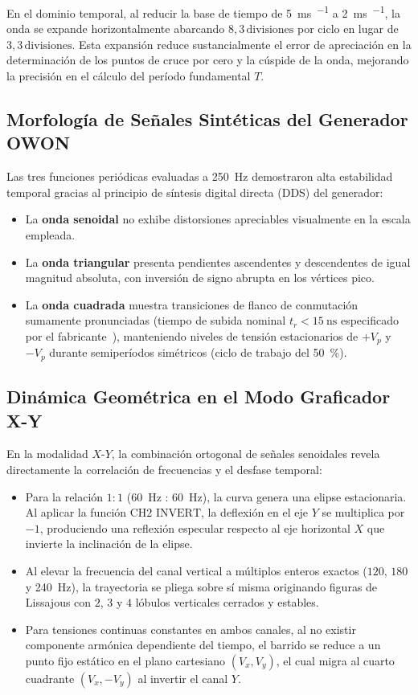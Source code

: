 En el dominio temporal, al reducir la base de tiempo de \qty{5}{\milli\second\per\division} a \qty{2}{\milli\second\per\division}, la onda se expande horizontalmente abarcando $8{,}3\,\text{divisiones}$ por ciclo en lugar de $3{,}3\,\text{divisiones}$. Esta expansión reduce sustancialmente el error de apreciación en la determinación de los puntos de cruce por cero y la cúspide de la onda, mejorando la precisión en el cálculo del período fundamental $T$.

\subsection{Morfología de Señales Sintéticas del Generador OWON}
Las tres funciones periódicas evaluadas a \qty{250}{\hertz} demostraron alta estabilidad temporal gracias al principio de síntesis digital directa (DDS) del generador:
\begin{itemize}
    \item La \textbf{onda senoidal} no exhibe distorsiones apreciables visualmente en la escala empleada.
    \item La \textbf{onda triangular} presenta pendientes ascendentes y descendentes de igual magnitud absoluta, con inversión de signo abrupta en los vértices pico.
    \item La \textbf{onda cuadrada} muestra transiciones de flanco de conmutación sumamente pronunciadas (tiempo de subida nominal $t_r < \qty{15}{\nano\second}$ especificado por el fabricante~\cite{owon_ags_spec}), manteniendo niveles de tensión estacionarios de $+V_p$ y $-V_p$ durante semiperíodos simétricos (ciclo de trabajo del \qty{50}{\percent}).
\end{itemize}

\subsection{Dinámica Geométrica en el Modo Graficador X-Y}
En la modalidad $X$-$Y$, la combinación ortogonal de señales senoidales revela directamente la correlación de frecuencias y el desfase temporal:
\begin{itemize}
    \item Para la relación $1:1$ (\qty{60}{\hertz} : \qty{60}{\hertz}), la curva genera una elipse estacionaria. Al aplicar la función $\text{CH2 INVERT}$, la deflexión en el eje $Y$ se multiplica por $-1$, produciendo una reflexión especular respecto al eje horizontal $X$ que invierte la inclinación de la elipse.
    \item Al elevar la frecuencia del canal vertical a múltiplos enteros exactos ($120$, $180$ y \qty{240}{\hertz}), la trayectoria se pliega sobre sí misma originando figuras de Lissajous con $2$, $3$ y $4$ lóbulos verticales cerrados y estables.
    \item Para tensiones continuas constantes en ambos canales, al no existir componente armónica dependiente del tiempo, el barrido se reduce a un punto fijo estático en el plano cartesiano $(V_x, V_y)$, el cual migra al cuarto cuadrante $(V_x, -V_y)$ al invertir el canal $Y$.
\end{itemize}
